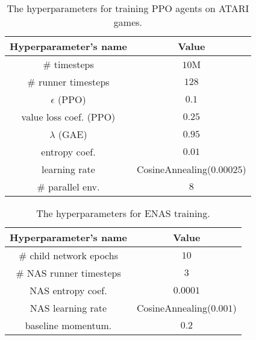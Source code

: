 \documentclass{svproc}
\begin{document}
\begin{appendix}
\begin{table}[!h]
\begin{center}
\begin{tabularx}{0.6\textwidth}{c|c}
    \hline
    \textbf{Hyperparameter's name} & \textbf{Value}\\
    \hline
        \# timesteps & $10$M    \\
        \# runner timesteps & $128$   \\  
        $\epsilon$ (PPO) & $0.1$   \\
        value loss coef. (PPO) & $0.25$ \\
        $\lambda$ (GAE) & $0.95$   \\
        entropy coef. & $0.01$   \\
        learning rate & CosineAnnealing($0.00025$)   \\
        \# parallel env. & $8$  \\
              
    \hline
\end{tabularx}
\caption{The hyperparameters for training PPO agents on ATARI games.}
\label{tab:params_scratch}
\end{center}
\end{table}

\begin{table}[!h]
\begin{center}
\begin{tabularx}{0.6\textwidth}{c|c}
    \hline
    \textbf{Hyperparameter's name} & \textbf{Value}\\
    \hline
        \# child network epochs & $10$    \\
        \# NAS runner timesteps & $3$   \\  
        NAS entropy coef. & $0.0001$   \\
        NAS learning rate & CosineAnnealing($0.001$)   \\
        baseline momentum. & $0.2$  \\
              
    \hline
\end{tabularx}
\caption{The hyperparameters for ENAS training.}
\label{tab:params_enas}
\end{center}
\end{table}



\end{appendix}
\end{document}
